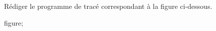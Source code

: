\documentclass[exercice]{thedocument}%
\begin{document}
%
Rédiger le programme de tracé correspondant à la figure ci-dessous.\vskip5pt\par\noindent
{\centering\<figure;\par}
\end{document}
